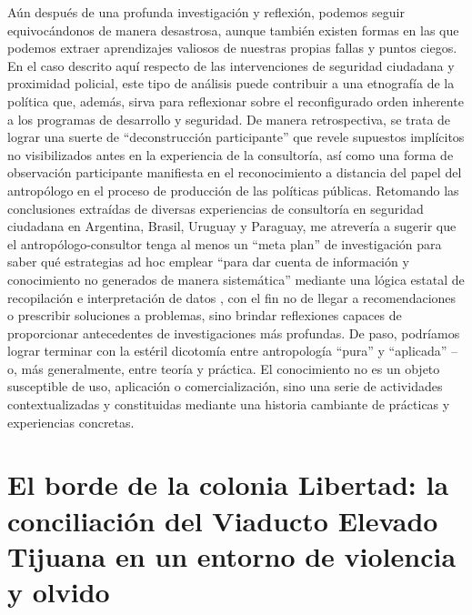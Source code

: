 \documentclass[
  spanish,
  11pt,
  a4paper,
]{scrbook}
\begin{document}
Aún después de una profunda investigación y reflexión, podemos seguir
equivocándonos de manera desastrosa, aunque también existen formas en
las que podemos extraer aprendizajes valiosos de nuestras propias fallas
y puntos ciegos. En el caso descrito aquí respecto de las intervenciones
de seguridad ciudadana y proximidad policial, este tipo de análisis
puede contribuir a una etnografía de la política que, además, sirva para
reflexionar sobre el reconfigurado orden inherente a los programas de
desarrollo y seguridad. De manera retrospectiva, se trata de lograr una
suerte de ``deconstrucción participante'' \autocite[17]{Shore1997} que
revele supuestos implícitos no visibilizados antes en la experiencia de
la consultoría, así como una forma de observación participante
manifiesta en el reconocimiento a distancia del papel del antropólogo en
el proceso de producción de las políticas públicas. Retomando las
conclusiones extraídas de diversas experiencias de consultoría en
seguridad ciudadana en Argentina, Brasil, Uruguay y Paraguay, me
atrevería a sugerir que el antropólogo-consultor tenga al menos un
``meta plan'' de investigación para saber qué estrategias ad hoc emplear
``para dar cuenta de información y conocimiento no generados de manera
sistemática'' mediante una lógica estatal de recopilación e
interpretación de datos \autocite[153]{Pita2015}, con el fin no de
llegar a recomendaciones o prescribir soluciones a problemas, sino
brindar reflexiones capaces de proporcionar antecedentes de
investigaciones más profundas. De paso, podríamos lograr terminar con la
estéril dicotomía entre antropología ``pura'' y ``aplicada'' --o, más
generalmente, entre teoría y práctica. El conocimiento no es un objeto
susceptible de uso, aplicación o comercialización, sino una serie de
actividades contextualizadas y constituidas mediante una historia
cambiante de prácticas y experiencias concretas.

\printbibliography[heading=subbibliography, title={Referencias Bibliográficas}]


\chapter{El borde de la colonia Libertad: la conciliación del Viaducto
Elevado Tijuana en un entorno de violencia y
olvido}\label{el-borde-de-la-colonia-libertad-la-conciliaciuxf3n-del-viaducto-elevado-tijuana-en-un-entorno-de-violencia-y-olvido}
\end{document}
